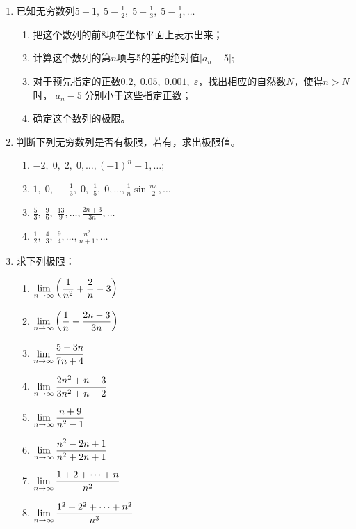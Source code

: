 \begin{enumerate}
    \item 已知无穷数列$5+1,\;5-\frac{1}{2},\;5+\frac{1}{3},\; 5-\frac{1}{4},\ldots$
\begin{enumerate}[(1)]
\item 把这个数列的前8项在坐标平面上表示出来；
\item 计算这个数列的第$n$项与5的差的绝对值$|a_n-5|$;
\item 对于预先指定的正数$0.2,\; 0.05,\; 0.001,\;\varepsilon$，找出相应的自然数$N$，使得$n>N$时，$|a_n-5|$分别小于这些指定正数；
\item 确定这个数列的极限。
\end{enumerate}

    \item 判断下列无穷数列是否有极限，若有，求出极限值。
\begin{enumerate}[(1)]
    \item $-2,\; 0,\; 2,\; 0,\ldots,(-1)^n-1,\ldots$;
    \item $1,\; 0,\; -\frac{1}{3},\; 0,\; \frac{1}{5},\; 0,\ldots,\frac{1}{n}\sin\frac{n\pi}{2},\ldots$    
        \item $\frac{5}{3},\; \frac{9}{6},\;\frac{13}{9},\ldots, \frac{2n+3}{3n},\ldots$
        \item $\frac{1}{2},\; \frac{4}{3},\; \frac{9}{4},\ldots,\frac{n^2}{n+1},\ldots$
\end{enumerate}

\item 求下列极限：
\begin{multicols}{2}
\begin{enumerate}[(1)]
    \item $\lim\limits_{n\to \infty} \left(\dfrac{1}{n^2}+\dfrac{2}{n}-3\right) $
    \item $\lim\limits_{n\to \infty} \left(\dfrac{1}{n}-\dfrac{2n-3}{3n}\right) $
    \item $\lim\limits_{n\to \infty} \dfrac{5-3n}{7n+4} $
    \item $\lim\limits_{n\to \infty} \dfrac{2n^2+n-3}{3n^2+n-2} $
    \item $\lim\limits_{n\to \infty} \dfrac{n+9}{n^2-1} $
    \item $\lim\limits_{n\to \infty} \dfrac{n^2-2n+1}{n^2+2n+1} $
    \item $\lim\limits_{n\to \infty} \dfrac{1+2+\cdots+n}{n^2} $
    \item $\lim\limits_{n\to \infty} \dfrac{1^2+2^2+\cdots+n^2}{n^3} $
\end{enumerate}
\end{multicols}



\end{enumerate}
